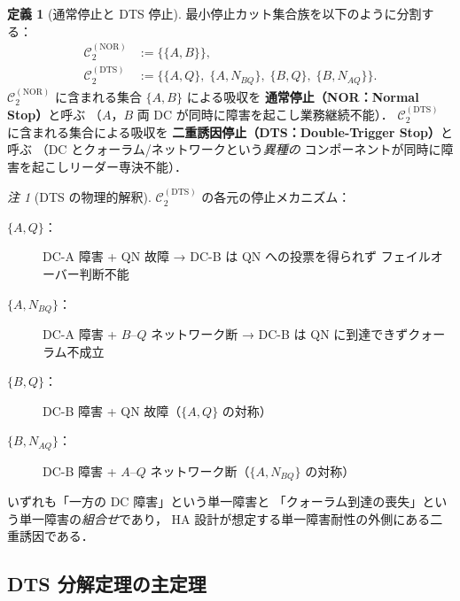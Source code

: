 \documentclass[12pt,a4paper]{article}
\theoremstyle{plain}
\theoremstyle{definition}
\newtheorem{definition}[theorem]{定義}
\theoremstyle{remark}
\newtheorem{remark}[theorem]{注}
\newcommand{\calCtwo}{\mathcal{C}_2}   %
\newcommand{\calCNOR}{\calCtwo^{(\mathrm{NOR})}}
\newcommand{\calCDTS}{\calCtwo^{(\mathrm{DTS})}}
\begin{document}
\begin{definition}[通常停止と DTS 停止]\label{def:DTS}
  最小停止カット集合族を以下のように分割する：
  \begin{align}
    \calCNOR &:= \bigl\{\{A,B\}\bigr\},
    \label{eq:CNOR}\\
    \calCDTS  &:= \bigl\{\{A,Q\},\;\{A,N_{BQ}\},\;\{B,Q\},\;\{B,N_{AQ}\}\bigr\}.
    \label{eq:CDTS}
  \end{align}
  $\calCNOR$ に含まれる集合 $\{A,B\}$ による吸収を
  \textbf{通常停止（NOR：Normal Stop）}と呼ぶ
  （$A$，$B$ 両 DC が同時に障害を起こし業務継続不能）．
  $\calCDTS$ に含まれる集合による吸収を
  \textbf{二重誘因停止（DTS：Double-Trigger Stop）}と呼ぶ
  （DC とクォーラム/ネットワークという\emph{異種の}
  コンポーネントが同時に障害を起こしリーダー専決不能）．
\end{definition}

\begin{remark}[DTS の物理的解釈]
  $\calCDTS$ の各元の停止メカニズム：
  \begin{description}
    \item[$\{A,Q\}$：] DC-A 障害 + QN 故障 → DC-B は QN への投票を得られず
          フェイルオーバー判断不能
    \item[$\{A,N_{BQ}\}$：] DC-A 障害 + $B$–$Q$ ネットワーク断 → DC-B は
          QN に到達できずクォーラム不成立
    \item[$\{B,Q\}$：] DC-B 障害 + QN 故障（$\{A,Q\}$ の対称）
    \item[$\{B,N_{AQ}\}$：] DC-B 障害 + $A$–$Q$ ネットワーク断（$\{A,N_{BQ}\}$ の対称）
  \end{description}
  いずれも「一方の DC 障害」という単一障害と
  「クォーラム到達の喪失」という単一障害の\emph{組合せ}であり，
  HA 設計が想定する単一障害耐性の外側にある二重誘因である．
\end{remark}

\subsection{DTS 分解定理の主定理}
\end{document}
